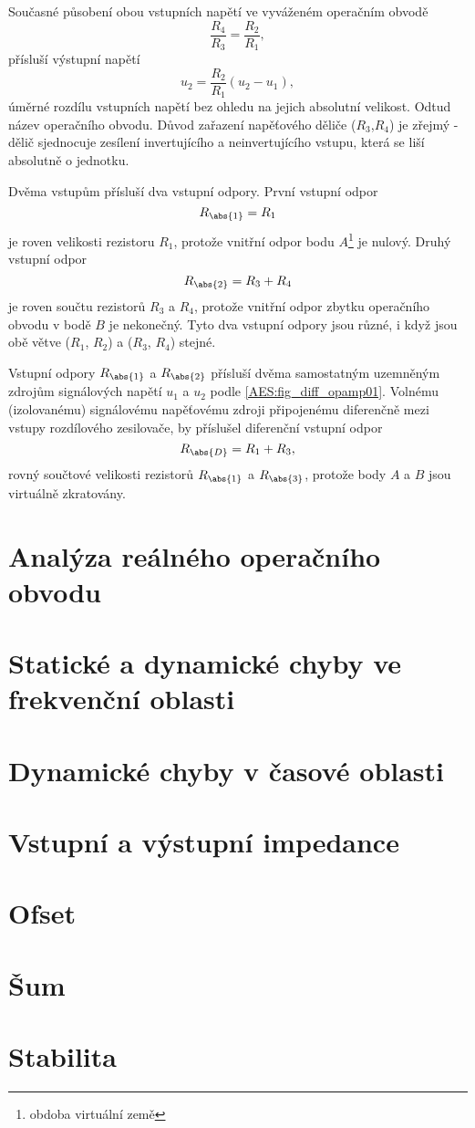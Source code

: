         Současné působení obou vstupních napětí ve vyváženém operačním obvodě
        $$\frac{R_4}{R_3}=\frac{R_2}{R_1},$$ přísluší výstupní napětí 
        \begin{equation}\label{AES:eq_diff_opamp}
          u_2 = \frac{R_2}{R_1}(u_2-u_1),   
        \end{equation}
        úměrné rozdílu vstupních napětí bez ohledu na jejich absolutní velikost. Odtud název 
        operačního obvodu. Důvod zařazení napěťového děliče ($R_3$,$R_4$) je zřejmý - dělič 
        sjednocuje zesílení invertujícího a neinvertujícího vstupu, která se liší absolutně o 
        jednotku. 
        
        Dvěma vstupům přísluší dva vstupní odpory. První vstupní odpor
        $$R_{\abs{1}} = R_1$$ je roven velikosti rezistoru $R_1$, protože vnitřní odpor bodu
        $A$\footnote{obdoba virtuální země} je nulový. Druhý vstupní odpor $$R_{\abs{2}} = R_3 +
        R_4$$ je roven součtu rezistorů $R_3$ a $R_4$, protože vnitřní odpor zbytku operačního
        obvodu v bodě $B$ je nekonečný. Tyto dva vstupní odpory jsou různé, i když jsou obě větve
        ($R_1$, $R_2$) a ($R_3$, $R_4$) stejné. 
        
        Vstupní odpory $R_{\abs{1}}$ a $R_{\abs{2}}$ přísluší dvěma samostatným uzemněným zdrojům 
        signálových napětí $u_1$ a $u_2$ podle \ref{AES:fig_diff_opamp01}. Volnému (izolovanému) 
        signálovému napěťovému zdroji připojenému diferenčně mezi vstupy rozdílového zesilovače, by 
        příslušel diferenční vstupní odpor $$R_{\abs{D}} = R_1 + R_3,$$ rovný součtové velikosti 
        rezistorů $R_{\abs{1}}$ a $R_{\abs{3}}$, protože body $A$ a $B$ jsou virtuálně zkratovány.

  \section{Analýza reálného operačního obvodu}\label{aesIchIVsecII}
  \section{Statické a dynamické chyby ve frekvenční oblasti}\label{aesIchIVsecIII}
  \section{Dynamické chyby v časové oblasti}\label{aesIchIVsecIV}
  \section{Vstupní a výstupní impedance}\label{aesIchIVsecV}
  \section{Ofset}\label{aesIchIVsecVI}
  \section{Šum}\label{aesIchIVsecVII}
  \section{Stabilita}\label{aesIchIVsecVIII}
